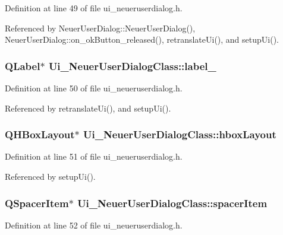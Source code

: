 Definition at line 49 of file ui\_\-neueruserdialog.h.

Referenced by NeuerUserDialog::NeuerUserDialog(), NeuerUserDialog::on\_\-okButton\_\-released(), retranslateUi(), and setupUi().\hypertarget{class_ui___neuer_user_dialog_class_4d5cd56ce59f029b603240b7a8d64108}{
\subsubsection[label\_\-7]{\setlength{\rightskip}{0pt plus 5cm}QLabel$\ast$ {\bf Ui\_\-NeuerUserDialogClass::label\_}}}
\label{class_ui___neuer_user_dialog_class_4d5cd56ce59f029b603240b7a8d64108}




Definition at line 50 of file ui\_\-neueruserdialog.h.

Referenced by retranslateUi(), and setupUi().\hypertarget{class_ui___neuer_user_dialog_class_d6d0d8c1e35e24110e43c89e8f1b2445}{
\subsubsection[hboxLayout]{\setlength{\rightskip}{0pt plus 5cm}QHBoxLayout$\ast$ {\bf Ui\_\-NeuerUserDialogClass::hboxLayout}}}
\label{class_ui___neuer_user_dialog_class_d6d0d8c1e35e24110e43c89e8f1b2445}




Definition at line 51 of file ui\_\-neueruserdialog.h.

Referenced by setupUi().\hypertarget{class_ui___neuer_user_dialog_class_a98d9c7863ca110cda0db7669c02ae25}{
\subsubsection[spacerItem]{\setlength{\rightskip}{0pt plus 5cm}QSpacerItem$\ast$ {\bf Ui\_\-NeuerUserDialogClass::spacerItem}}}
\label{class_ui___neuer_user_dialog_class_a98d9c7863ca110cda0db7669c02ae25}




Definition at line 52 of file ui\_\-neueruserdialog.h.

